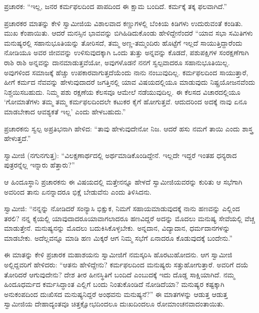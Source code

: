  ಪ್ರಚಾರಕ: “ಇಲ್ಲ, ಜನರ ಕರ್ಮಫಲದಿಂದ ಪಾಪದಿಂದ ಈ ಕ್ಷಾಮ ಬಂದಿದೆ. ಕರ್ಮಕ್ಕೆ ತಕ್ಕ ಫಲವಾಗಿದೆ.” 

 ಪ್ರಚಾರಕರ ಮಾತನ್ನು ಕೇಳಿ ಸ್ವಾಮೀಜಿಯ ವಿಶಾಲವಾದ ಕಣ್ಣುಗಳಲ್ಲಿ ಬೆಂಕಿಯ ಕಿಡಿಗಳು ಉದುರುವಂತೆ ಕಂಡಿತು. ಮುಖ ಕೆಂಪಾಯಿತು. ಆದರೆ ಮನಸ್ಸಿನ ಭಾವವನ್ನು ಬಿಗಿಹಿಡಿದುಕೊಂಡು ಹೇಳಿದ್ದೇನೆಂದರೆ “ಯಾವ ಸಭಾ ಸಮಿತಿಗಳು ಮನುಷ್ಯರಲ್ಲಿ ಸಹಾನುಭೂತಿಯನ್ನು ತೋರಿಸದೆ, ತಮ್ಮ ಅಣ್ಣ-ತಮ್ಮಂದಿರು ಹೊಟ್ಟೆಗೆ ಇಲ್ಲದೆ ಸಾಯುತ್ತಿದ್ದಾರೆಂದು ನೋಡಿಯೂ ಅವರ ಜೀವವನ್ನು ಉಳಿಸುವುದಕ್ಕಾಗಿ ಒಂದು ತುತ್ತು ಅನ್ನವನ್ನು ಕೊಡದೆ, ಪಶುಪಕ್ಷಿಗಳ ಸಂರಕ್ಷಣೆಗಾಗಿ ರಾಶಿ ರಾಶಿ ಅನ್ನವನ್ನು ದಾನಮಾಡುತ್ತವೆಯೋ, ಅವುಗಳೊಡನೆ ನನಗೆ ಸ್ವಲ್ಪವಾದರೂ ಸಹಾನುಭೂತಿಯಿಲ್ಲ. ಅವುಗಳಿಂದ ಸಮಾಜಕ್ಕೆ ಹೆಚ್ಚು ಉಪಕಾರವಾಗುತ್ತದೆಯೆಂದು ನಾನು ನಂಬುವುದಿಲ್ಲ. ಕರ್ಮಫಲದಿಂದ ಸಾಯುತ್ತಾರೆ, ಹೀಗೆ ಕರ್ಮದ ನೆವವನ್ನು ಹೇಳುವುದಾದರೆ ಜಗತ್ತಿನಲ್ಲಿ ಯಾವ ವಿಷಯದಲ್ಲಿಯೂ ಮಾಡುವುದು ನಿಷ್ಪ್ರಯೋಜನವೆಂದು ನಿಶ್ಚಯಿಸಬಹುದು. ನಿಮ್ಮ ಪಶು ರಕ್ಷಣೆಯ ಕೆಲಸವೂ ಆಮೇಲೆ ನಡೆಯುವುದಿಲ್ಲ. ಈ ಕೆಲಸದ ವಿಚಾರದಲ್ಲಿಯೂ ‘ಗೋಮಾತೆಗಳು ತಮ್ಮ ತಮ್ಮ ಕರ್ಮಫಲದಿಂದಲೇ ಕಟುಕರ ಕೈಗೆ ಹೋಗುತ್ತವೆ. ಆದುದರಿಂದ ಅದಕ್ಕೆ ನಾವು ಏನೂ ಮಾಡಬೇಕಾದ ಆವಶ್ಯಕತೆ ಇಲ್ಲ’ ಎಂದು ಹೇಳಬಹುದು.” 

 ಪ್ರಚಾರಕನು ಸ್ವಲ್ಪ ಅಪ್ರತಿಭನಾಗಿ ಹೇಳಿದ: “ತಾವು ಹೇಳುವುದೇನೋ ನಿಜ. ಆದರೆ ಹಸು ನಮಗೆ ತಾಯಿ ಎಂದು ಶಾಸ್ತ್ರ ಹೇಳುತ್ತದೆ.” 

 ಸ್ವಾಮೀಜಿ (ನಗುನಗುತ್ತ): “ವಿಲಕ್ಷಣಾರ್ಥದಲ್ಲಿ ಅರ್ಥಮಾಡಿಕೊಂಡಿದ್ದೇನೆ. ಇಲ್ಲದೇ ಇದ್ದರೆ ಇಂತಹ ಧನ್ಯರಾದ ಪುತ್ರರನ್ನೆಲ್ಲ ಇನ್ನಾರು ಹೆತ್ತಾರು?” 

 ಆ ಹಿಂದೂಸ್ಥಾನಿ ಪ್ರಚಾರಕನು ಈ ವಿಷಯದಲ್ಲಿ ಮತ್ತೇನನ್ನೂ ಹೇಳದೆ ಸ್ವಾಮೀಜಿಯವರನ್ನು ಕುರಿತು ಆ ಸಭೆಗಾಗಿ ಅವರಿಂದ ತಾನು ಏನನ್ನಾದರೂ ಭಿಕ್ಷೆ ಬೇಡುವೆನು ಎಂದು ತಿಳಿಸಿದನು. 

 ಸ್ವಾಮೀಜಿ: “ನನ್ನನ್ನು ನೋಡಿದರೆ ಸಂನ್ಯಾಸಿ ಭಿಕ್ಷುಕ, ನಿಮಗೆ ಸಹಾಯ\break ಮಾಡುವುದಕ್ಕೆ ನಾನು ಹಣವನ್ನು ಎಲ್ಲಿಂದ ತರಲಿ? ನನ್ನ ಕೈಯಲ್ಲಿ ಯಾವುದಾದರೂ\break ಯಾವಾಗಲಾದರೂ ಹಣವಿದ್ದರೆ ಅದನ್ನು ಮೊದಲು ಮನುಷ್ಯ ಸೇವೆಯಲ್ಲಿ ವೆಚ್ಚ ಮಾಡುತ್ತೇನೆ. ಮನುಷ್ಯನನ್ನು ಮೊದಲು ಬದುಕಿಸಿಕೊಳ್ಳಬೇಕು. ಅನ್ನದಾನ, ವಿದ್ಯಾದಾನ, ಧರ್ಮದಾನಗಳನ್ನು ಮಾಡಬೇಕು. ಅದೆಲ್ಲವನ್ನೂ ಮಾಡಿ ಹಣ ಮಿಕ್ಕರೆ ಆಗ ನಿಮ್ಮ ಸಭೆಗೆ ಏನಾದರೂ ಕೊಡುವುದಕ್ಕೆ ಬಂದೇನು.” 

 ಈ ಮಾತನ್ನು ಕೇಳಿ ಪ್ರಚಾರಕ ಮಹಾಶಯನು ಸ್ವಾಮೀಜಿಗೆ ನಮಸ್ಕರಿಸಿ ಹೊರಟುಹೋದನು. ಆಗ ಸ್ವಾಮೀಜಿ ಅಲ್ಲಿದ್ದವರಿಗೆ ಹೇಳಿದರು: “ಆತನು ಹೇಳಿದ್ದೇನು? ಕರ್ಮಫಲದಿಂದ ಮನುಷ್ಯರು ಸತ್ತುಹೋಗುತ್ತಾರೆ. ಅವರಿಗೆ ದಯೆ ತೋರಿದರೆ ಆಗುವುದೇನು? ದೇಶ ತೀರ ಹೀನಸ್ಥಿತಿಗೆ ಬಂದಿದೆ ಎಂಬುದಕ್ಕೆ ಇದು ದೊಡ್ಡ ಸಾಕ್ಷಿಯಾಗಿದೆ. ನಮ್ಮ ಹಿಂದೂಧರ್ಮದ ಕರ್ಮಸಿದ್ಧಾಂತ ಎಲ್ಲಿಗೆ ಬಂದು ನಿಂತುಕೊಂಡಿದೆ ನೋಡಿದೆಯಾ? ಮನುಷ್ಯರ ಕಷ್ಟಕ್ಕಾಗಿ ಅನುಕಂಪದಿಂದ ದುಃಖಿಸದ ಮನುಷ್ಯನಿದ್ದರೆ ಅಂಥವನು ಮನುಷ್ಯನೆ?” ಈ ಮಾತಗಳನ್ನು ಆಡುತ್ತ ಆಡುತ್ತ ಸ್ವಾಮೀಜಿಯ ದೇಹಾದ್ಯಂತವೂ ಚಿತ್ತಕ್ಷೋಭದಿಂದಲೂ ದುಃಖದಿಂದಲೂ ರೋಮಾಂಚನವಾದಂತಾಯಿತು. 

